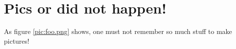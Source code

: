\chapter{Pics or did not happen!}

As figure \ref{pic:foo.png} shows, one must not remember so much stuff to make pictures!



